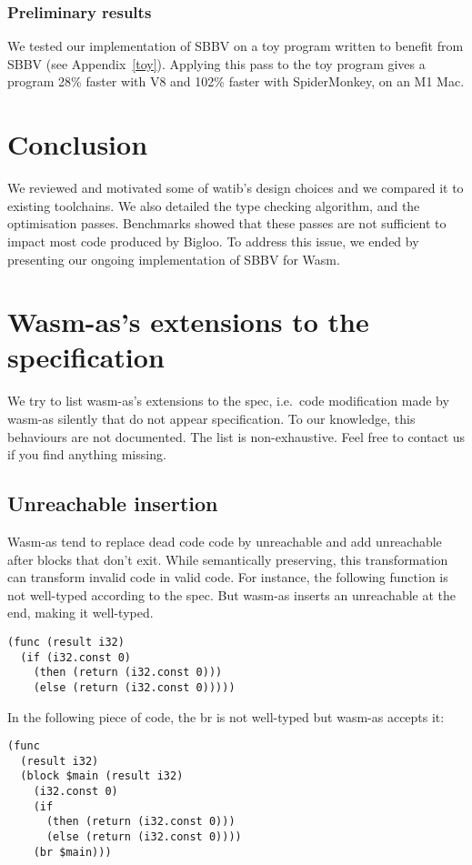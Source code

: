 \documentclass[a4paper,11pt]{article}
\renewcommand{\baselinestretch}{1.05}
\begin{document}
\subsubsection{Preliminary results}
We tested our implementation of SBBV on a toy program written to benefit from
SBBV (see Appendix~\ref{toy}). Applying this pass to the toy program gives a
program 28\% faster with V8 and 102\% faster with SpiderMonkey, on an M1 Mac.

\section{Conclusion}
We reviewed and motivated some of \textsf{watib}'s design choices and we
compared it to existing toolchains. We also detailed the type checking
algorithm, and the optimisation passes. Benchmarks showed that these passes are
not sufficient to impact most code produced by Bigloo. To address this issue, we
ended by presenting our ongoing implementation of SBBV for Wasm.

\renewcommand{\baselinestretch}{1}
\printbibliography
\renewcommand{\baselinestretch}{1.05}

\newpage
\appendix
\section{Wasm-as's extensions to the specification}\label{wasmasex}
We try to list wasm-as's extensions to the spec, i.e.\ code modification made by
wasm-as silently that do not appear specification. To our knowledge, this
behaviours are not documented. The list is non-exhaustive. Feel free to contact
us if you find anything missing.
\subsection{\textsf{Unreachable} insertion}
Wasm-as tend to replace dead code code by \textsf{unreachable} and add
\textsf{unreachable} after blocks that don't exit. While semantically
preserving, this transformation can transform invalid code in valid code. For
instance, the following function is not well-typed according to the spec. But
wasm-as inserts an \textsf{unreachable} at the end, making it well-typed.
\begin{lstlisting}
(func (result i32)
  (if (i32.const 0)
    (then (return (i32.const 0)))
    (else (return (i32.const 0)))))
\end{lstlisting}

In the following piece of code, the \textsf{br} is not well-typed but wasm-as accepts
it:
\begin{lstlisting}
(func
  (result i32)
  (block $main (result i32)
    (i32.const 0)
    (if
      (then (return (i32.const 0)))
      (else (return (i32.const 0))))
    (br $main)))
\end{lstlisting}
\end{document}

